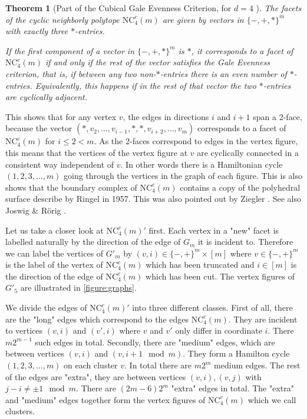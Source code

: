 \documentclass[a4paper,12pt]{book}
\theoremstyle{plain}
\newtheorem{theorem}{Theorem}[section]
\theoremstyle{definition}
\newcommand\NCC{\mathrm{NC}^c}
\begin{document}
\begin{theorem}
[Part of the Cubical Gale Evenness Criterion, for $d=4$ {\cite[Thm.~18]{Z62}}] 
The facets of the cyclic neighborly polytope $\NCC_4(m)$ are given by vectors in
$\{-,+,*\}^m$ with exactly three $*$-entries. 

If the first component of a vector in $\{-,+,*\}^m$ is $*$, it corresponds to a facet 
of $\NCC_4(m)$ if and only if the rest of the vector satisfies the Gale Evenness criterion, 
that is, if between any two non-$*$-entries there is an even number of $*$-entries.
Equivalently, this happens if in the rest of that vector the two $*$-entries are
cyclically adjacent.
\end{theorem}

 This shows that for any vertex $v$, the edges in directions $i$ and $i+1$ span a 2-face, because
the vector $(*,v_2, \dots, v_{i-1}, *, *, v_{i+2}, \dots, v_m)$ corresponds to a facet of $\NCC_4(m)$
for $i\le 2 < m$. As the 2-faces correspond to edges in the vertex figure, this means that the vertices 
of the vertex figure at $v$ are cyclically connected in a consistent way independent of $v$. In other words
there is a Hamiltonian cycle $(1,2,3,\dots, m)$ going through the vertices in the graph of each figure.
This is also shows that the boundary complex of $\NCC_4(m)$ contains a copy of the polyhedral surface 
describe by Ringel \cite{ringel55:_ueber_probl_wuerf_wuerf} in 1957. This was also pointed out by
Ziegler \cite[Sect 3.]{Z100}. See also Joswig \& Rörig \cite{joswig:_neigh}.

Let us take a closer look at $\NCC_4(m)'$ first.  Each vertex in a "new" facet is labelled naturally by
the direction of the edge of $G_m$ it is incident to. Therefore we can label the vertices of $G'_m$
by $(v,i) \in \{-,+\}^m \times [m]$ where $v \in \{-,+\}^m$ is the label of the vertex of $\NCC_4(m)$ which has been truncated and $i \in [m]$ 
is the direction of the edge of $\NCC_4(m)$ which has been cut. The vertex figures of $G'_5$ are illustrated in \ref{figure:graphs}.

We divide the edges of $\NCC_4(m)'$ into three different classes. First of all, there are the "long" edges which correspond to the edges $\NCC_4(m)$.
They are incident to vertices $(v,i)$ and $(v',i)$ where $v$ and $v'$ only differ in coordinate $i$. There $m2^{m-1}$ such edges in total. Secondly, 
there are "medium" edges, which are between vertices $(v,i)$ and $(v,i+1\mod m)$. They form a Hamilton cycle $(1,2,3,\dots, m)$ on each cluster $v$. In total there are $m2^m$ medium edges. The rest of the edges are "extra", they are between vertices $(v,i), (v,j)$ with $j-i \neq \pm 1 \mod m$.
There are $(2m-6)2^m$ "extra" edges in total. The "extra" and "medium" edges together form the vertex figures of $\NCC_4(m)$ which we call clusters. 
\end{document}
